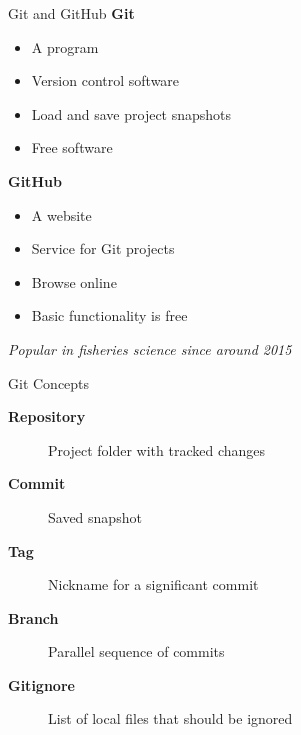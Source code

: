 \documentclass[aspectratio=169]{beamer}
\begin{document}
\begin{frame}{Git and GitHub}\small
  {\bf\darkblue Git}\\[-1ex]
  \begin{itemize}
    \item[] A program \\[0.8ex]
    \item[] Version control software \\[0.8ex]
    \item[] Load and save project snapshots \\[0.8ex]
    \item[] Free software \\[4ex]
  \end{itemize}
  {\bf\darkblue GitHub}\\[-1ex]
  \begin{itemize}
    \item[] A website \\[0.8ex]
    \item[] Service for Git projects \\[0.8ex]
    \item[] Browse online \\[0.8ex]
    \item[] Basic functionality is free \\[4ex]
  \end{itemize}
  \darkgray\it\fns Popular in fisheries science since around 2015
\end{frame}


\begin{frame}{Git Concepts}\small
  \begin{description}
    \item[\bf\darkblue Repository] Project folder with tracked changes
    \\[5ex]
    \item[\bf\darkblue Commit] Saved snapshot \\[5ex]
    \item[\bf\darkblue Tag] Nickname for a significant commit \\[5ex]
    \item[\bf\darkblue Branch] Parallel sequence of commits \\[5ex]
    \item[\bf\darkblue Gitignore] List of local files that should be ignored
  \end{description}
\end{frame}
\end{document}

